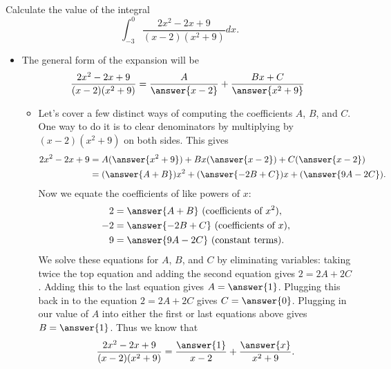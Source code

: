\documentclass{ximera}
\begin{document}
\begin{example}
Calculate the value of the integral
\[ \int_{-3}^0 \frac{2 x^2 - 2x + 9}{(x-2)(x^2+9)} dx. \]
\begin{itemize}
\item The general form of the expansion will be
\[ \frac{2 x^2 - 2x + 9}{(x-2)(x^2+9)} = \frac{A}{\answer{x-2}} + \frac{Bx + C}{\answer{x^2+9}} \]
\begin{itemize}
\item Let's cover a few distinct ways of computing the coefficients $A$, $B$, and $C$.  One way to do it is to clear denominators by multiplying by $(x-2)(x^2+9)$ on both sides. This gives
\[ \begin{aligned} 2 x^2 - 2x + 9 & =  A ( \answer{x^2 + 9}) + B x ( \answer{x-2}) + C ( \answer{x-2}) \\ & = (\answer{A + B}) x^2 + (\answer{-2B+C})x + (\answer{9A-2C}). \end{aligned}\]
Now we equate the coefficients of like powers of $x$:
\[ \begin{aligned}
2 & = \answer{A + B} \ \text{(coefficients of } x^2), \\
-2 & = \answer{-2B + C}  \ \text{(coefficients of } x), \\
9 & = \answer{9A-2C} \ \text{(constant terms)}.
\end{aligned} \]
We solve these equations for $A$, $B$, and $C$ by eliminating variables: taking twice the top equation and adding the second equation gives $2 = 2 A + 2C$. Adding this to the last equation gives $A = \answer{1}$. Plugging this back in to the equation $2 = 2A + 2C$ gives $C = \answer{0}$.  Plugging in our value of $A$ into either the first or last equations above gives $B = \answer{1}$.  Thus we know that
\[ \frac{2x^2 - 2x + 9}{(x-2)(x^2+9)} = \frac{\answer{1}}{x-2} + \frac{\answer{x}}{x^2+9}. \]


\end{itemize}
\end{itemize}
\end{example}
\end{document}
